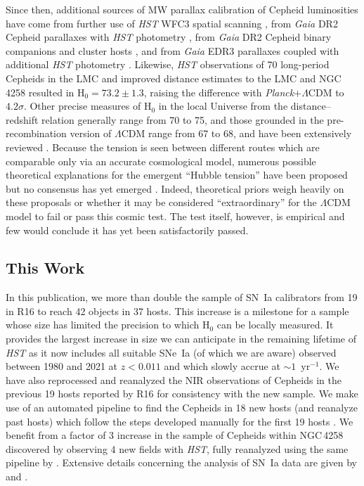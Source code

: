 \documentclass[12pt]{aastex631}
\begin{document}
Since then, additional sources of MW parallax calibration of Cepheid luminosities have come from further use of {\it HST}  WFC3 spatial scanning \citep{Riess:2018a}, from {\it Gaia} DR2 Cepheid parallaxes with {\it HST}  photometry \citep{Riess:2018b}, from {\it Gaia} DR2 Cepheid binary companions and cluster hosts \citep{Breuval:2020}, and from {\it Gaia} EDR3 parallaxes coupled with additional {\it HST} photometry \citep{Riess:2021}.  Likewise, {\it HST}  observations of 70 long-period Cepheids in the LMC \citep{Riess:2019} and improved distance estimates to the LMC \citep{Pietrzynski:2019} and NGC$\,$4258 \citep{Reid:2019} resulted in H$_0=73.2\pm1.3$, raising the difference with {\it Planck}$+\Lambda$CDM to $4.2\sigma$.  Other precise measures of H$_0$ in the local Universe from the distance--redshift relation generally range from 70 to 75, and those grounded in the pre-recombination version of $\Lambda$CDM range from 67 to 68, and have been extensively reviewed \citep{Verde:2019,Divalentino:2021,Shah:2021}.  Because the tension is seen between different routes which are comparable only via an accurate cosmological model, numerous possible theoretical explanations for the emergent ``Hubble tension'' have been proposed but no consensus has yet emerged \citep{Divalentino:2021}.   Indeed, theoretical priors weigh heavily on these proposals or whether it may be considered ``extraordinary'' for the $\Lambda$CDM model to fail or pass this cosmic test.  The test itself, however, is empirical and few would conclude it has yet been satisfactorily passed.  	

\subsection{This Work\label{sc:1.3}}

In this publication, we more than double the sample of SN~Ia calibrators from 19 in R16 to reach 42 objects in 37 hosts.  This increase is a milestone for a sample whose size has limited the precision to which H$_0$ can be locally measured.  It provides the largest increase in size we can anticipate in the remaining lifetime of {\it HST} as it now includes all suitable SNe~Ia (of which we are aware) observed between 1980 and 2021 at $z<0.011$ and which slowly accrue at $\sim 1$~yr$^{-1}$.  We have also reprocessed and reanalyzed the NIR observations of Cepheids in the previous 19 hosts reported by R16 for consistency with the new sample.  We make use of an automated pipeline \citep[][hereafter Y22b]{Yuan:2021_SN} to find the Cepheids in 18 new hosts (and reanalyze past hosts) which follow the steps developed manually for the first 19 hosts \citep[][hereafter H16]{Hoffmann:2016}. We benefit from a factor of 3 increase in the sample of Cepheids within NGC$\,$4258 discovered by observing 4 new fields with {\it HST}, fully reanalyzed using the same pipeline by \citet[][hereafter Y22a]{Yuan:2021_N4258}. Extensive details concerning the analysis of SN~Ia data are given by \citet{Scolnic:2021} and \citet{Brout:2022}.
\end{document}
